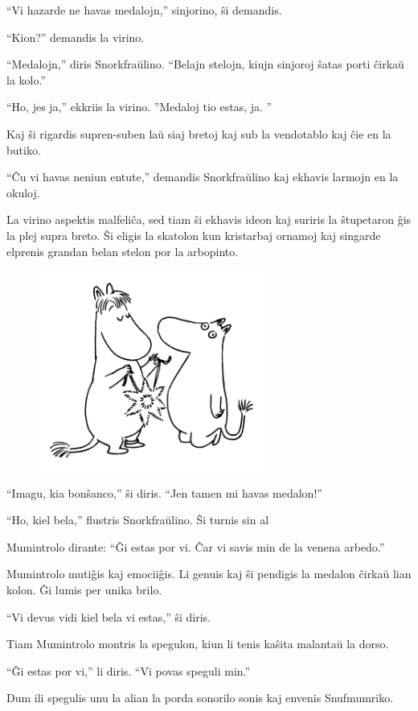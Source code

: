 ``Vi hazarde ne havas medalojn,'' sinjorino, ŝi demandis.

``Kion?'' demandis la virino.

``Medalojn,'' diris Snorkfraŭlino. ``Belajn stelojn, kiujn sinjoroj ŝatas porti ĉirkaŭ la kolo.''

``Ho, jes ja,'' ekkriis la virino. ''Medaloj tio estas, ja. ''

Kaj ŝi rigardis supren-suben laŭ siaj bretoj kaj sub la vendotablo kaj ĉie en la butiko.

``Ĉu vi havas neniun entute,'' demandis Snorkfraŭlino kaj ekhavis larmojn en la okuloj.

La virino aspektis malfeliĉa, sed tiam ŝi ekhavis ideon kaj suriris la ŝtupetaron ĝis la plej supra breto. Ŝi eligis la skatolon kun kristarbaj ornamoj kaj singarde elprenis grandan belan stelon por la arbopinto.

\begin{figure}[htbp]
\centering
\includegraphics[width=211pt,height=186pt]{6-4.png}
\caption{}
\label{6-4}
\end{figure}

``Imagu, kia bonŝanco,'' ŝi diris. ``Jen tamen mi havas medalon!''

``Ho, kiel bela,'' flustris Snorkfraŭlino. Ŝi turnis sin al

Mumintrolo dirante: ``Ĝi estas por vi. Ĉar vi savis min de la venena arbedo.''

Mumintrolo mutiĝis kaj emociiĝis. Li genuis kaj ŝi pendigis la medalon ĉirkaŭ lian kolon. Ĝi lumis per unika brilo.

``Vi devus vidi kiel bela vi estas,'' ŝi diris.

Tiam Mumintrolo montris la spegulon, kiun li tenis kaŝita malantaŭ la dorso.

``Ĝi estas por vi,'' li diris. ``Vi povas speguli min.''

Dum ili spegulis unu la alian la porda sonorilo sonis kaj envenis Snufmumriko.

